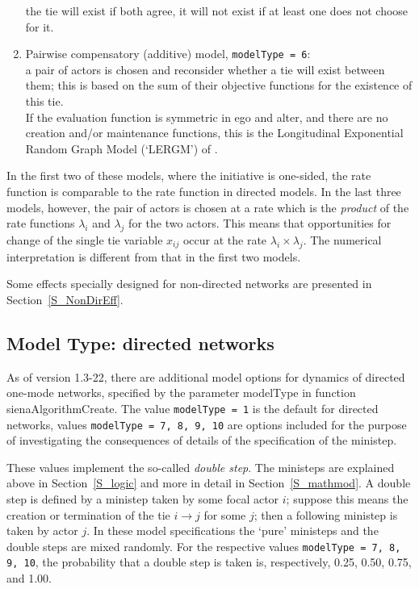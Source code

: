 \documentclass[a4paper,fleqn,11pt]{article}
\newcommand{\+}{\, + \,}
\newcommand{\sfn}[1]{\textsf{#1}}
\begin{document}
\begin{enumerate}
      the tie will exist if both agree,
      it will not exist if at least one does not choose for it.
\item Pairwise compensatory (additive) model,
      \texttt{modelType = 6}:\\ %
      a pair of actors is chosen and reconsider
      whether a tie will exist between them;
      this is based on the sum of their objective functions
      for the existence of this tie.\\
      If the evaluation function is symmetric in ego and alter,
      and there are no creation and/or maintenance functions,
      this is the Longitudinal Exponential Random Graph Model
      (`LERGM') of \citet{KoskinenSnijders2013}.
\end{enumerate}
In the first two of these models, where the initiative is one-sided,
the rate function is comparable to the rate function in directed models.
In the last three models, however, the pair of actors is chosen at a rate
which is the \emph{product} of the rate functions
$\lambda_i$ and $\lambda_j$ for the two actors.
This means that opportunities for change of the single tie variable $x_{ij}$
occur at the rate $\lambda_i \times \lambda_j$.
The numerical interpretation is different from that in the first two models.

Some effects specially designed for non-directed networks
are presented in Section~\ref{S_NonDirEff}.


\subsection{Model Type: directed networks}
\label{S_modeltype_dir}

As of version 1.3-22, there are additional model options for dynamics
of directed one-mode networks, specified by the parameter \sfn{modelType} in function
\textsf{sienaAlgorithmCreate}.
The value \texttt{modelType = 1} is the default for directed networks, values
\texttt{modelType = 7, 8, 9, 10} are options included for the purpose
of investigating the consequences of details of the specification of the ministep.

These values implement the so-called \emph{double step}.
The ministeps are explained above in Section~\ref{S_logic} and more in detail
in Section~\ref{S_mathmod}.
A double step is defined by a ministep taken by some focal actor $i$;
suppose this means the creation or termination of the tie
$i \rightarrow j$ for some $j$; then a following ministep is taken by actor $j$.
In these model specifications the `pure' ministeps and the double steps
are mixed randomly.
For the respective values \texttt{modelType = 7, 8, 9, 10},
the probability that a double step is taken is, respectively,
0.25, 0.50, 0.75, and 1.00.
\end{document}
